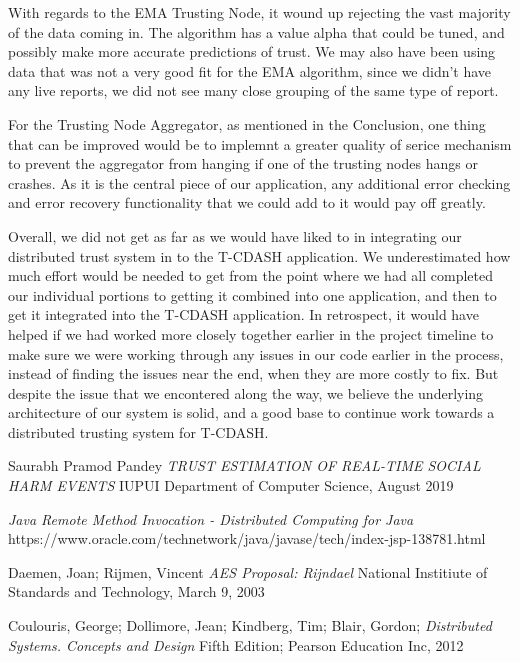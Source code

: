 \documentclass[11pt]{article}
\begin{document}
With regards to the EMA Trusting Node, it wound up rejecting the vast majority of the data coming in. The algorithm has a value alpha that could be tuned, and possibly make more accurate predictions of trust. We may also have been using data that was not a very good fit for the EMA algorithm, since we didn't have any live reports, we did not see many close grouping of the same type of report.

For the Trusting Node Aggregator, as mentioned in the Conclusion, one thing that can be improved would be to implemnt a greater quality of serice mechanism to prevent the aggregator from hanging if one of the trusting nodes hangs or crashes. As it is the central piece of our application, any additional error checking and error recovery functionality that we could add to it would pay off greatly.

Overall, we did not get as far as we would have liked to in integrating our distributed trust system in to the T-CDASH application. We underestimated how much effort would be needed to get from the point where we had all completed our individual portions to getting it combined into one application, and then to get it integrated into the T-CDASH application. In retrospect, it would have helped if we had worked more closely together earlier in the project timeline to make sure we were working through any issues in our code earlier in the process, instead of finding the issues near the end, when they are more costly to fix. But despite the issue that we encontered along the way, we believe the underlying architecture of our system is solid, and a good base to continue work towards a distributed trusting system for T-CDASH.

\cleardoublepage
{}
\begin{thebibliography}{9}
  Saurabh Pramod Pandey
  \textit{TRUST ESTIMATION OF REAL-TIME SOCIAL HARM EVENTS}
  IUPUI Department of Computer Science, August 2019

  \textit{Java Remote Method Invocation - Distributed Computing for Java}
  https://www.oracle.com/technetwork/java/javase/tech/index-jsp-138781.html

  Daemen, Joan; Rijmen, Vincent
  \textit{AES Proposal: Rijndael}
  National Institiute of Standards and Technology, March 9, 2003

  Coulouris, George; Dollimore, Jean; Kindberg, Tim; Blair, Gordon;
  \textit{Distributed Systems. Concepts and Design}
  Fifth Edition; Pearson Education Inc, 2012

\end{thebibliography}
\end{document}
